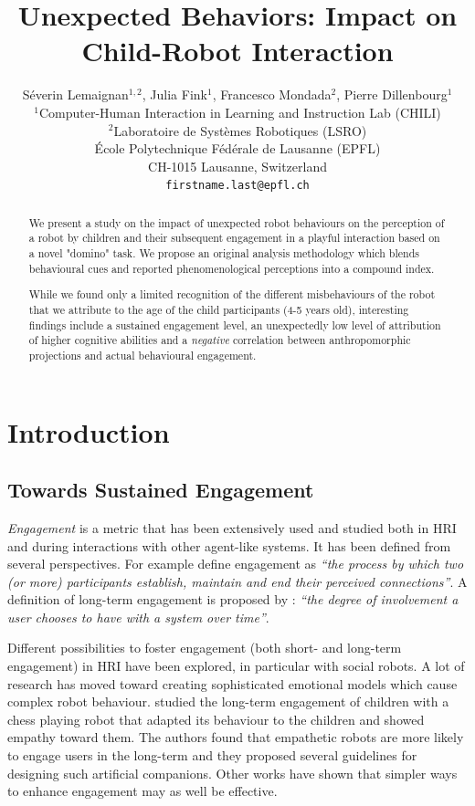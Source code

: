 \documentclass[letterpaper, 10pt, conference]{ieeeconf}
\title{\LARGE \bf
Unexpected Behaviors: Impact on Child-Robot Interaction
}
\author{
    S\'{e}verin Lemaignan$^{1,2}$, Julia Fink$^{1}$, Francesco Mondada$^{2}$, Pierre
    Dillenbourg$^{1}$\\
$^{1}$Computer-Human Interaction in Learning and Instruction Lab (CHILI) \\
$^{2}$Laboratoire de Systèmes Robotiques (LSRO) \\
École Polytechnique F\'{e}d\'{e}rale de Lausanne (EPFL) \\
CH-1015 Lausanne, Switzerland \\
{\tt\small firstname.last@epfl.ch}
}
\begin{document}
\sloppy %
\maketitle
\begin{abstract}

We present a study on the impact of unexpected robot behaviours on the
perception of a robot by children and their subsequent engagement in a playful
interaction based on a novel "domino" task.
We propose an original analysis methodology which blends behavioural cues and
reported phenomenological perceptions into a compound index.

While we found only a limited recognition of the different misbehaviours of the
robot that we attribute to the age of the child participants (4-5 years old),
interesting findings include a sustained engagement level, an unexpectedly low
level of attribution of higher cognitive abilities and a \emph{negative}
correlation between anthropomorphic projections and actual behavioural
engagement.

\end{abstract}
\section{Introduction}
\subsection{Towards Sustained Engagement}

\emph{Engagement} is a metric that has been extensively used and studied both
in HRI and during interactions with other agent-like systems. It has been
defined from several perspectives. For example \cite{sidner_where_2004} define
engagement as \textit{``the process by which two (or more) participants
establish, maintain and end their perceived connections''}. A definition of
long-term engagement is proposed by \cite{bickmore_maintaining_2010}:
\textit{``the degree of involvement a user chooses to have with a system over
time''}.

Different possibilities to foster engagement (both short- and long-term
engagement) in HRI have been explored, in particular with social robots. A lot
of research has moved toward creating sophisticated emotional models which cause
complex robot behaviour. \cite{leite_long-term_2013} studied the long-term
engagement of children with a chess playing robot that adapted its behaviour to
the children and showed empathy toward them. The authors found that empathetic robots
are more likely to engage users in the long-term and they proposed several
guidelines for designing such artificial companions. Other works
\cite{bickmore_maintaining_2010,short_no_2010} have shown that simpler ways to
enhance engagement may as well be effective.
\end{document}
